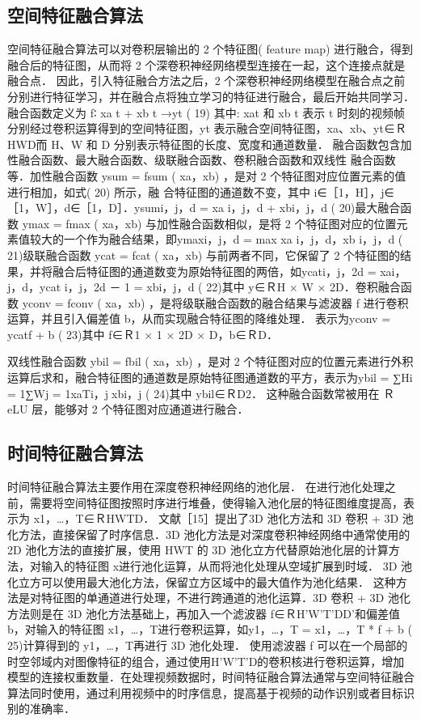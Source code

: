 \subsection{空间特征融合算法}
空间特征融合算法可以对卷积层输出的 2 个特征图( feature map) 进行融合，得到融合后的特征图，从而将 2 个深卷积神经网络模型连接在一起，这个连接点就是融合点． 因此，引入特征融合方法之后，2 个深卷积神经网络模型在融合点之前分别进行特征学习，并在融合点将独立学习的特征进行融合，最后开始共同学习． 融合函数定义为
f∶ xa
t + xb
t →yt ( 19)
其中: xat 和 xb
t 表示 t 时刻的视频帧分别经过卷积运算得到的空间特征图，yt 表示融合空间特征图，xa、xb、yt∈ＲHWD而 H、W 和 D 分别表示特征图的长度、宽度和通道数量． 融合函数包含加性融合函数、最大融合函数、级联融合函数、卷积融合函数和双线性
融合函数等．加性融合函数 ysum = fsum ( xa，xb) ，是对 2 个特征图对应位置元素的值进行相加，如式( 20) 所示，融
合特征图的通道数不变，其中 i∈［1，H］，j∈［1，W］，d∈［1，D］．ysumi，j，d = xa
i，j，d + xbi，j，d ( 20)最大融合函数 ymax = fmax ( xa，xb) 与加性融合函数相似，是将 2 个特征图对应的位置元素值较大的一个作为融合结果，即ymaxi，j，d = max{ xa	i，j，d，xb	i，j，d } ( 21)级联融合函数 ycat = fcat ( xa，xb) 与前两者不同，它保留了 2 个特征图的结果，并将融合后特征图的通道数变为原始特征图的两倍，如ycati，j，2d = xai，j，d，ycat
i，j，2d － 1 = xbi，j，d ( 22)其中 y∈ＲH × W × 2D．卷积融合函数 yconv = fconv ( xa，xb) ，是将级联融合函数的融合结果与滤波器 f 进行卷积运算，并且引入偏差值 b，从而实现融合特征图的降维处理． 表示为yconv = ycatf + b ( 23)其中 f∈Ｒ1 × 1 × 2D × D，b∈ＲD．

双线性融合函数 ybil = fbil ( xa，xb) ，是对 2 个特征图对应的位置元素进行外积运算后求和，融合特征图的通道数是原始特征图通道数的平方，表示为ybil = ∑Hi = 1∑Wj = 1xaTi，jxbi，j ( 24)其中 ybil∈ＲD2． 这种融合函数常被用在 ＲeLU 层，能够对 2 个特征图对应通道进行融合．

\subsection{时间特征融合算法}

时间特征融合算法主要作用在深度卷积神经网络的池化层． 在进行池化处理之前，需要将空间特征图按照时序进行堆叠，使得输入池化层的特征图维度提高，表示为 x1，…，T∈ＲHWTD． 文献［15］提出了3D 池化方法和 3D 卷积 + 3D 池化方法，直接保留了时序信息．3D 池化方法是对深度卷积神经网络中通常使用的 2D 池化方法的直接扩展，使用 HWT 的 3D 池化立方代替原始池化层的计算方法，对输入的特征图 x进行池化运算，从而将池化处理从空域扩展到时域． 3D 池化立方可以使用最大池化方法，保留立方区域中的最大值作为池化结果． 这种方法是对特征图的单通道进行处理，不进行跨通道的池化运算．3D 卷积 + 3D 池化方法则是在 3D 池化方法基础上，再加入一个滤波器 f∈ＲH'W'T'DD'和偏差值 b，对输入的特征图 x1，…，T进行卷积运算，如y1，…，T = x1，…，T * f + b ( 25)计算得到的 y1，…，T再进行 3D 池化处理． 使用滤波器 f 可以在一个局部的时空邻域内对图像特征的组合，通过使用H'W'T'D的卷积核进行卷积运算，增加模型的连接权重数量．在处理视频数据时，时间特征融合算法通常与空间特征融合算法同时使用，通过利用视频中的时序信息，提高基于视频的动作识别或者目标识别的准确率．
